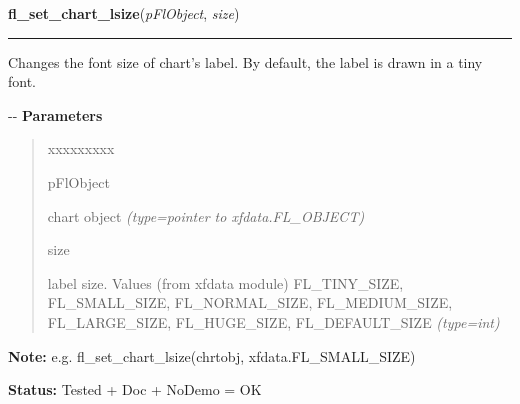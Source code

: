 \hspace{.8\funcindent}\begin{boxedminipage}{\funcwidth}

    \raggedright \textbf{fl\_set\_chart\_lsize}(\textit{pFlObject}, \textit{size})

    \vspace{-1.5ex}

    \rule{\textwidth}{0.5\fboxrule}
\setlength{\parskip}{2ex}

Changes the font size of chart's label. By default, the label is
drawn in a tiny font.

-{}-
\setlength{\parskip}{1ex}
      \textbf{Parameters}
      \vspace{-1ex}

      \begin{quote}
        \begin{Ventry}{xxxxxxxxx}

          \item[pFlObject]


chart object
            {\it (type=pointer to xfdata.FL\_OBJECT)}

          \item[size]


label size. Values (from xfdata module) FL\_TINY\_SIZE, FL\_SMALL\_SIZE,
FL\_NORMAL\_SIZE, FL\_MEDIUM\_SIZE, FL\_LARGE\_SIZE, FL\_HUGE\_SIZE,
FL\_DEFAULT\_SIZE
            {\it (type=int)}

        \end{Ventry}

      \end{quote}

\textbf{Note:} 
e.g. fl\_set\_chart\_lsize(chrtobj, xfdata.FL\_SMALL\_SIZE)


\textbf{Status:} 
Tested + Doc + NoDemo = OK


    \end{boxedminipage}

    \label{xformslib:flchart:fl_set_chart_lcolor}

    \vspace{0.5ex}

